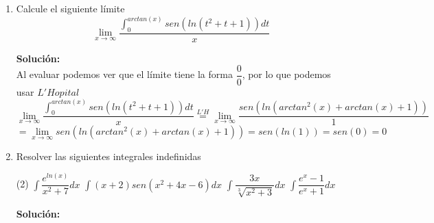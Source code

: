 \documentclass[12pt]{article}
\newenvironment{solucion}
{\begin{mdframed}[backgroundcolor=black!10]
		{\bf Solución:}\\
	}
	{
	\end{mdframed}
}
\newenvironment{preguntas}
{\begin{enumerate}\itemsep12pt
	}
	{
	\end{enumerate}
}
\newcommand{\ra}{\rightarrow}
\begin{document}
\begin{preguntas}
\begin{solucion}
Notemos que podemos escribir $F(x)$ de la siguiente forma
$$F(x) =
\displaystyle\int_{1-x}^{1} \ln(t^2)dt + \displaystyle\int_{1}^{1+x} \ln(t^2)dt =
-\displaystyle\int_{1}^{1-x} \ln(t^2)dt + \displaystyle\int_{1}^{1+x} \ln(t^2)dt
$$
Luego, al derivar,
$$F'(x) = -\ln((1-x)^2)\cdot (-1) + \ln((1+x)^2)$$
Simplificando,
$$F'(x) = \ln((1-x)^2) + \ln((1+x)^2)
= \ln(((1-x)(1+x))^2)
= 2\ln(1-x^2)$$
Luego, como 
$$0 \leq x \leq \dfrac{1}{2} \ra \dfrac{3}{4} \leq 1-x^2 \leq 1$$
Concluimos que 
$$F'(x) = 2\ln(1-x^2) \leq 0$$
Por lo que la función es decreciente.
\end{solucion}
\item Calcule el siguiente límite
	$$\lim\limits_{x \ra \infty} \dfrac{\displaystyle\int_0^{arctan(x)} sen(ln(t^2+t+1)) dt}{x}$$
\begin{solucion}
Al evaluar podemos ver que el límite tiene la forma $\dfrac{0}{0}$, por lo que podemos usar $L'Hopital$
		$$\lim\limits_{x \ra \infty} \dfrac{\displaystyle\int_0^{arctan(x)} sen(ln(t^2+t+1)) dt}{x}
		\stackrel{L'H}{=} \lim\limits_{x \ra \infty} \dfrac{sen(ln(arctan^2(x)+arctan(x)+1))}{1}$$
		$$= \lim\limits_{x \ra \infty} sen(ln(arctan^2(x)+arctan(x)+1)) = sen(ln(1)) = sen(0) = 0$$
\end{solucion}
\item Resolver las siguientes integrales indefinidas
\begin{tasks}(2)
\task $\displaystyle\int \dfrac{e^{ln(x)}}{x^2+7}dx$
\task $\displaystyle\int (x+2)sen(x^2+4x-6)dx$
\task $\displaystyle\int \dfrac{3x}{\sqrt[3]{x^2+3}}dx$
\task $\displaystyle\int \dfrac{e^x-1}{e^x+1}dx$
\end{tasks}
\begin{solucion}


\end{solucion}
\end{preguntas}
\end{document}
